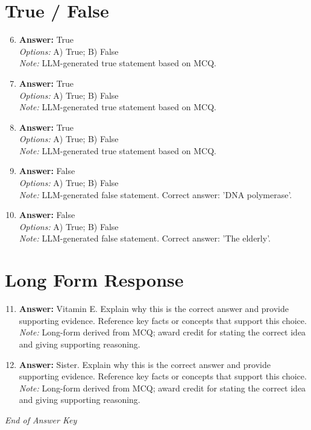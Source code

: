 \documentclass[12pt]{article}
\begin{document}
\section*{True / False}
\begin{enumerate}[label=\arabic*.]
\setcounter{enumi}{5}
\item \textbf{Answer:} True
\\ \textit{Options:} A) True; B) False
\\ \textit{Note:} LLM-generated true statement based on MCQ.
\item \textbf{Answer:} True
\\ \textit{Options:} A) True; B) False
\\ \textit{Note:} LLM-generated true statement based on MCQ.
\item \textbf{Answer:} True
\\ \textit{Options:} A) True; B) False
\\ \textit{Note:} LLM-generated true statement based on MCQ.
\item \textbf{Answer:} False
\\ \textit{Options:} A) True; B) False
\\ \textit{Note:} LLM-generated false statement. Correct answer: 'DNA polymerase'.
\item \textbf{Answer:} False
\\ \textit{Options:} A) True; B) False
\\ \textit{Note:} LLM-generated false statement. Correct answer: 'The elderly'.
\end{enumerate}

\section*{Long Form Response}
\begin{enumerate}[label=\arabic*.]
\setcounter{enumi}{10}
\item \textbf{Answer:} Vitamin E. Explain why this is the correct answer and provide supporting evidence. Reference key facts or concepts that support this choice.
\\ \textit{Note:} Long-form derived from MCQ; award credit for stating the correct idea and giving supporting reasoning.
\item \textbf{Answer:} Sister. Explain why this is the correct answer and provide supporting evidence. Reference key facts or concepts that support this choice.
\\ \textit{Note:} Long-form derived from MCQ; award credit for stating the correct idea and giving supporting reasoning.
\end{enumerate}

\vfill
\noindent\textit{End of Answer Key}
\end{document}
